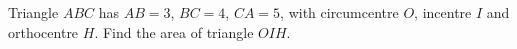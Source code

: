 Triangle $ABC$ has $AB=3$, $BC=4$, $CA=5$, with circumcentre $O$, incentre $I$ and orthocentre $H$. Find the area of triangle $OIH$.
